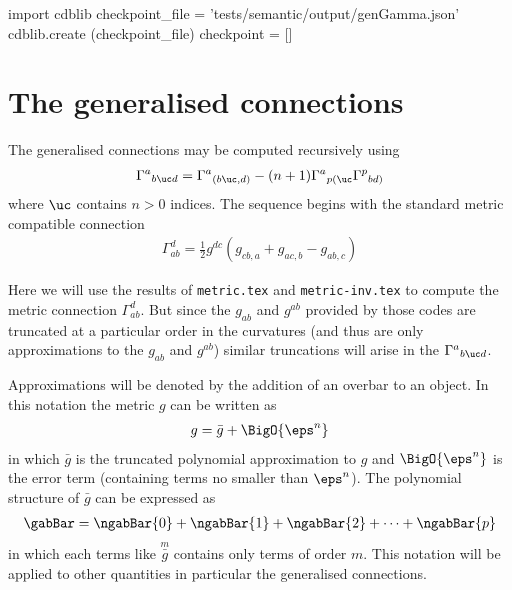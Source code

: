 \documentclass[12pt]{cdblatex}
\begin{document}

\bgroup
{}
\begin{cadabra}
   import cdblib
   checkpoint_file = 'tests/semantic/output/genGamma.json'
   cdblib.create (checkpoint_file)
   checkpoint = []
\end{cadabra}
\egroup

\section*{The generalised connections}

The generalised connections may be computed recursively using
\begin{align}
   \label{eq:GenGamma}
\Gamma^{a}{}_{b\uc d} = \Gamma^{a}{}_{(b\uc,d)}
                - (n+1) \Gamma^{a}{}_{p(\uc}
                        \Gamma^{p}{}_{bd)}
\end{align}
where $\uc$ contains $n>0$ indices. The sequence begins with the standard metric compatible connection
\begin{align}
   \Gamma^{d}_{ab} = \frac{1}{2} g^{dc}\left( g_{cb,a} + g_{ac,b} - g_{ab,c} \right)
\end{align}

Here we will use the results of {\tt metric.tex} and {\tt metric-inv.tex} to compute the metric connection
$\Gamma^{d}_{ab}$. But since the $g_{ab}$ and $g^{ab}$ provided by those codes are truncated at a
particular order in the curvatures (and thus are only approximations to the $g_{ab}$ and $g^{ab}$) similar
truncations will arise in the $\Gamma^{a}{}_{b\uc d}$.

Approximations will be denoted by the addition of an overbar to an object. In this notation the metric
$g$ can be written as
\begin{align}
   g = {\bar g} + \BigO{\eps^n}
\end{align}
in which ${\bar g}$ is the truncated polynomial approximation to $g$ and $\BigO{\eps^n}$ is the error term
(containing terms no smaller than $\eps^n$). The polynomial structure of ${\bar g}$ can be expressed as
\begin{align}
   \gabBar = \ngabBar{0}
           + \ngabBar{1}
           + \ngabBar{2}
           + \dots
           + \ngabBar{p}
\end{align}
in which each terms like $\overset{m}{\bar g}$ contains only terms of order $m$. This notation will be applied
to other quantities in particular the generalised connections.
\end{document}
